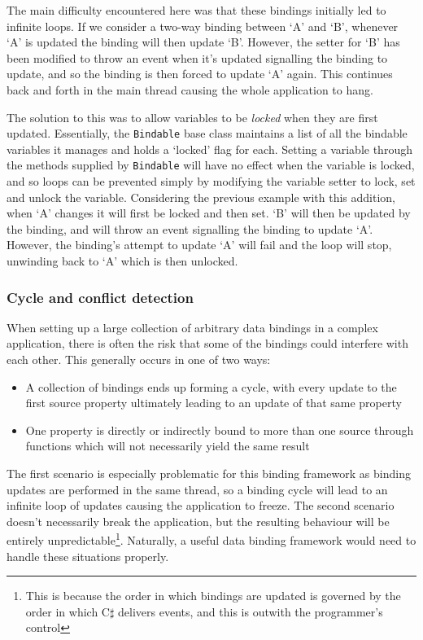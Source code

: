 \documentclass[12pt,twoside,notitlepage]{report}
\begin{document}
The main difficulty encountered here was that these bindings initially led to infinite loops. If we consider a two-way binding between `A' and `B', whenever `A' is updated the binding will then update `B'. However, the setter for `B' has been modified to throw an event when it's updated signalling the binding to update, and so the binding is then forced to update `A' again. This continues back and forth in the main thread causing the whole application to hang.

The solution to this was to allow variables to be \textit{locked} when they are first updated. Essentially, the \texttt{Bindable} base class maintains a list of all the bindable variables it manages and holds a `locked' flag for each. Setting a variable through the methods supplied by \texttt{Bindable} will have no effect when the variable is locked, and so loops can be prevented simply by modifying the variable setter to lock, set and unlock the variable. Considering the previous example with this addition, when `A' changes it will first be locked and then set. `B' will then be updated by the binding, and will throw an event signalling the binding to update `A'. However, the binding's attempt to update `A' will fail and the loop will stop, unwinding back to `A' which is then unlocked.

\subsubsection{Cycle and conflict detection}

When setting up a large collection of arbitrary data bindings in a complex application, there is often the risk that some of the bindings could interfere with each other. This generally occurs in one of two ways:

\begin{itemize}
	\item A collection of bindings ends up forming a cycle, with every update to the first source property ultimately leading to an update of that same property
	\item One property is directly or indirectly bound to more than one source through functions which will not necessarily yield the same result
\end{itemize}

The first scenario is especially problematic for this binding framework as binding updates are performed in the same thread, so a binding cycle will lead to an infinite loop of updates causing the application to freeze. The second scenario doesn't necessarily break the application, but the resulting behaviour will be entirely unpredictable\footnote{This is because the order in which bindings are updated is governed by the order in which C$\sharp$ delivers events, and this is outwith the programmer's control}. Naturally, a useful data binding framework would need to handle these situations properly.
\end{document}
